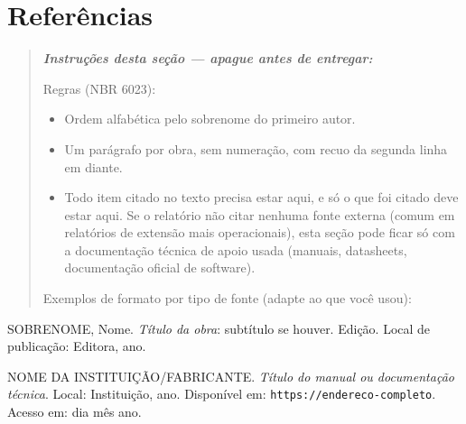 \documentclass[article,12pt,a4paper]{abntex2}
\newenvironment{instrucoes}{%
  \begin{quotation}\footnotesize\itshape
  \noindent\textbf{\upshape Instruções desta seção — apague antes de entregar:}\par\smallskip
}{%
  \end{quotation}
}
\begin{document}
\section*{Referências}

\begin{instrucoes}
Regras (NBR 6023):
\begin{itemize}
  \item Ordem alfabética pelo sobrenome do primeiro autor.
  \item Um parágrafo por obra, sem numeração, com recuo da segunda linha em diante.
  \item Todo item citado no texto precisa estar aqui, e só o que foi citado deve estar aqui. Se o relatório não citar nenhuma fonte externa (comum em relatórios de extensão mais operacionais), esta seção pode ficar só com a documentação técnica de apoio usada (manuais, datasheets, documentação oficial de software).
\end{itemize}
Exemplos de formato por tipo de fonte (adapte ao que você usou):
\end{instrucoes}

\newcommand{\referencia}[1]{\par\noindent\hangindent=1cm #1\par\medskip}

\referencia{SOBRENOME, Nome. \textit{Título da obra}: subtítulo se houver.
Edição. Local de publicação: Editora, ano.}

\referencia{NOME DA INSTITUIÇÃO/FABRICANTE. \textit{Título do manual ou
documentação técnica}. Local: Instituição, ano. Disponível em:
\texttt{https://endereco-completo}. Acesso em: dia mês ano.}
\end{document}
